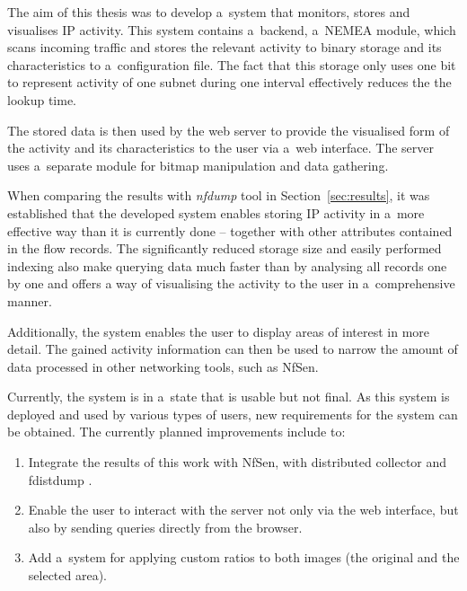 The aim of this thesis was to develop a~system that monitors, stores and 
visualises IP activity. This system contains a~backend, a~NEMEA module,
which scans incoming traffic and stores the relevant activity to binary storage
and its characteristics to a~configuration file. The fact that this storage
only uses one bit to represent activity of one subnet during one interval
effectively reduces the the lookup time.

The stored data is then used by the web server to provide the visualised
form of the activity and its characteristics to the user via a~web interface.
The server uses a~separate module for bitmap manipulation and data gathering.

When comparing the results with \textit{nfdump} tool in Section~\ref{sec:results},
it was established that the developed system enables storing IP activity
in a~more effective way than it is currently done -- together with other attributes
contained in the flow records. The significantly reduced storage size and easily
performed indexing also make querying data much faster than by analysing all records
one by one and offers a way of visualising the activity to the user in a~comprehensive manner.

Additionally, the system enables the user to display areas of interest in more
detail. The gained activity information can then be used to narrow the amount
of data processed in other networking tools, such as NfSen.

Currently, the system is in a~state that is usable but not final.
As this system is deployed and used by various types of users, new
requirements for the system can be obtained.
The currently planned improvements include to:

\begin{enumerate}
   \item Integrate the results of this work with NfSen, with
   distributed collector and fdistdump \cite{fdistdump}.
   \item Enable the user to interact with the server not only via the web
   interface, but also by sending queries directly from the browser.
   \item Add a~system for applying custom ratios to both images (the original
   and the selected area).
\end{enumerate}

